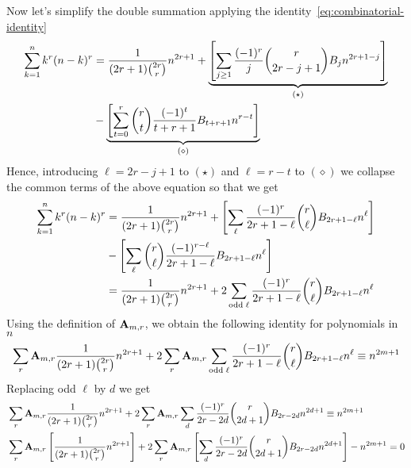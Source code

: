 Now let's simplify the double summation applying the identity~\eqref{eq:combinatorial-identity}
\begin{equation*}
    \begin{split}
        \sum_{k=1}^{n} k^{r} (n-k)^{r}
        &= \frac{1}{(2r+1) \binom{2r}r} n^{2r+1}
        + \underbrace{\left[ \sum_{j \geq 1} \frac{(-1)^r}{j} \binom{r}{2r-j+1} {B}\sb{j} n^{2r+1-j} \right]}_{(\star)} \\
        &- \underbrace{\left[ \sum_{t=0}^{r} \binom{r}{t} \frac{(-1)^t}{t+r+1} {B}\sb{t+r+1} n^{r-t} \right]}_{(\diamond)}
    \end{split}
\end{equation*}
Hence, introducing $\ell=2r-j+1$ to $(\star)$ and $\ell=r-t$ to $(\diamond)$ we collapse the common terms of the above
equation so that we get
\begin{equation*}
    \begin{split}
        \sum_{k=1}^{n} k^{r} (n-k)^{r}
        &= \frac{1}{(2r+1) \binom{2r}r} n^{2r+1}
        + \left[ \sum_{\ell} \frac{(-1)^r}{2r+1-\ell} \binom{r}{\ell} {B}\sb{2r+1-\ell} n^{\ell} \right] \\
        &- \left[ \sum_{\ell} \binom{r}{\ell} \frac{(-1)^{r-\ell}}{2r+1-\ell} {B}\sb{2r+1-\ell} n^{\ell} \right]\\
        &= \frac{1}{(2r+1) \binom{2r}r} n^{2r+1} + 2 \sum_{\mathrm{odd \; \ell}} \frac{(-1)^r}{2r+1-\ell} \binom{r}{\ell} {B}\sb{2r+1-\ell} n^{\ell}
    \end{split}
\end{equation*}
Using the definition of ${\mathbf{A}} \sb{m,r}$, we obtain the following identity for polynomials in $n$
\begin{equation*}
    \sum_{r} {\mathbf{A}} \sb{m,r} \frac{1}{(2r+1) \binom{2r}r} n^{2r+1}
    + 2 \sum_{r} {\mathbf{A}} \sb{m,r} \sum_{\mathrm{odd \; \ell}} \frac{(-1)^r}{2r+1-\ell} \binom{r}{\ell} {B}\sb{2r+1-\ell} n^{\ell}
    \equiv n^{2m+1}
\end{equation*}
Replacing odd $\ell$ by $d$ we get
\begin{equation}
    \begin{split}
        &\sum_{r} {\mathbf{A}} \sb{m,r} \frac{1}{(2r+1) \binom{2r}r} n^{2r+1}
        + 2 \sum_{r} {\mathbf{A}} \sb{m,r} \sum_{d} \frac{(-1)^r}{2r-2d} \binom{r}{2d+1} {B}\sb{2r-2d} n^{2d+1}
        \equiv n^{2m+1} \\
        &\sum_{r} {\mathbf{A}} \sb{m,r} \left[ \frac{1}{(2r+1) \binom{2r}r} n^{2r+1} \right]
        + 2 \sum_{r} {\mathbf{A}} \sb{m,r} \left[ \sum_{d} \frac{(-1)^r}{2r-2d} \binom{r}{2d+1} {B}\sb{2r-2d} n^{2d+1} \right]
        - n^{2m+1} = 0
    \end{split}\label{eq:equation7}
\end{equation}
